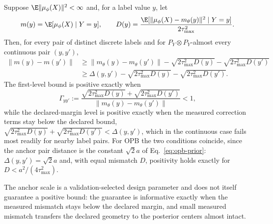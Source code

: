 \begin{theorem}
\label{thm:pgib-separation}
Suppose $\E\|\mu_\phi(X)\|^2<\infty$ and, for a label value $y$, let
\begin{equation}
m(y)=\E[\mu_\phi(X)\mid Y=y],\qquad
D(y)=\frac{\E[\|\mu_\phi(X)-m_\theta(y)\|^2\mid Y=y]}{2\tau_{\max}^2}.
\label{eq:pgib-class-rate}
\end{equation}
Then, for every pair of distinct discrete labels and for $P_Y\otimes P_Y$-almost
every continuous pair $(y,y')$,
\begin{equation}
\begin{aligned}
\|m(y)-m(y')\|
&\ge\|m_\theta(y)-m_\theta(y')\|-\sqrt{2\tau_{\max}^2D(y)}-\sqrt{2\tau_{\max}^2D(y')}\\
&\ge\Delta(y,y')-\sqrt{2\tau_{\max}^2D(y)}-\sqrt{2\tau_{\max}^2D(y')}.
\end{aligned}
\label{eq:pgib-separation}
\end{equation}
The first-level bound is positive exactly when
\begin{equation}
\Gamma_{yy'}:=\frac{\sqrt{2\tau_{\max}^2D(y)}+\sqrt{2\tau_{\max}^2D(y')}}
{\|m_\theta(y)-m_\theta(y')\|}<1,
\label{eq:separation-tightness-ratio}
\end{equation}
while the declared-margin level is positive exactly when the measured correction
terms stay below the declared bound,
$\sqrt{2\tau_{\max}^2D(y)}+\sqrt{2\tau_{\max}^2D(y')}<\Delta(y,y')$, which in the
continuous case fails most readily for nearby label pairs. For OPB the two
conditions coincide, since the anchor pair distance is the constant $\sqrt2a$ of
Eq.~\eqref{eq:opb-prior}: $\Delta(y,y')=\sqrt2a$ and, with equal mismatch $D$,
positivity holds exactly for $D<a^2/(4\tau_{\max}^2)$. 

The anchor scale is a
validation-selected design parameter and does not itself guarantee a positive
bound: the guarantee is informative exactly when the measured mismatch stays below
the declared margin, and small measured mismatch transfers the declared geometry
to the posterior centers almost intact.
\end{theorem}

